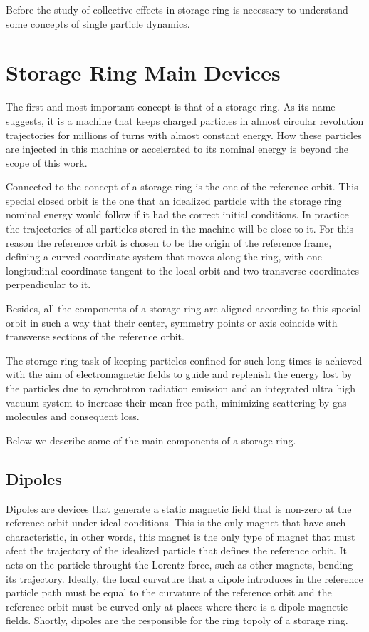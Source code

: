 \documentclass[
	12pt,				%
	openright,			%
	oneside,			%
	a4paper,		%
	chapter=TITLE,		%
	section=TITLE,		%
    brazil,				%
	english,			%
	sumario=tradicional,
	]{abntex2}
\begin{document}
Before the study of collective effects in storage ring is necessary to understand some concepts of single particle dynamics.

  \section{Storage Ring Main Devices} \label{ssec:storage_ring_main_devices}

  The first and most important concept is that of a storage ring. As its name suggests, it is a machine that keeps charged particles in almost circular revolution trajectories for millions of turns with almost constant energy. How these particles are injected in this machine or accelerated to its nominal energy is beyond the scope of this work.

  Connected to the concept of a storage ring is the one of the reference orbit. This special closed orbit is the one that an idealized particle with the storage ring nominal energy would follow if it had the correct initial conditions. In practice the trajectories of all particles stored in the machine will be close to it. For this reason the reference orbit is chosen to be the origin of the reference frame, defining a curved coordinate system that moves along the ring, with one longitudinal coordinate tangent to the local orbit and two transverse coordinates perpendicular to it.

  Besides, all the components of a storage ring are aligned according to this special orbit in such a way that their center, symmetry points or axis coincide with transverse sections of the reference orbit.

  The storage ring task of keeping particles confined for such long times is achieved with the aim of electromagnetic fields to guide and replenish the energy lost by the particles due to synchrotron radiation emission and an integrated ultra high vacuum system to increase their mean free path, minimizing scattering by gas molecules and consequent loss.

  Below we describe some of the main components of a storage ring.

    \subsection{Dipoles}

    Dipoles are devices that generate a static magnetic field that is non-zero at the reference orbit under ideal conditions. This is the only magnet that have such characteristic, in other words, this magnet is the only type of magnet that must afect the trajectory of the idealized particle that defines the reference orbit. It acts on the particle throught the Lorentz force, such as other magnets, bending its trajectory. Ideally, the local curvature that a dipole introduces in the reference particle path must be equal to the curvature of the reference orbit and the reference orbit must be curved only at places where there is a dipole magnetic fields. Shortly, dipoles are the responsible for the ring topoly of a storage ring.
\end{document}
